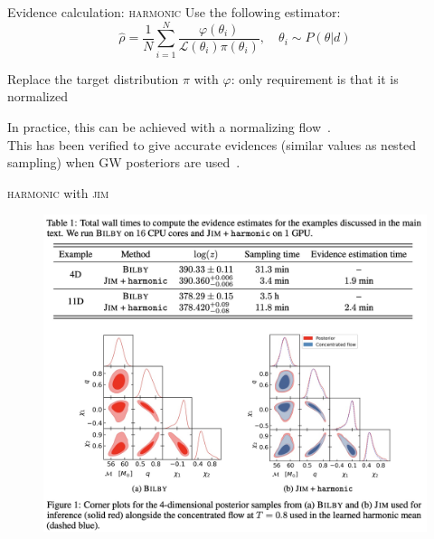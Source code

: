 \documentclass[usenames,dvipsnames,t]{beamer}
\begin{document}
\begin{frame}[allowframebreaks]{Evidence calculation: \textsc{harmonic}}
  Use the following estimator:
  \begin{equation*}
    \hat{\rho} = \frac{1}{N} \sum_{i=1}^N \frac{\varphi(\theta_i)}{\mathcal{L}(\theta_i)\pi(\theta_i)}, \quad \theta_i \sim P(\theta|d)
  \end{equation*}

  \vspace{5mm}
  Replace the target distribution $\pi$ with $\varphi$: only requirement is that it is normalized 
  
  \vspace{5mm}
  In practice, this can be achieved with a normalizing flow~\cite{polanska2024learnedharmonicmeanestimation}. \\
  
  \vspace{5mm}
  This has been verified to give accurate evidences (similar values as nested sampling) when GW posteriors are used~\cite{Polanska:2024zpn}. 
\end{frame}

\begin{frame}{\textsc{harmonic} with \textsc{jim}}
  \begin{figure}
    \centering
    \includegraphics[scale=0.275]{Figures/polanska.jpg}
  \end{figure}
  
\end{frame}
\end{document}
